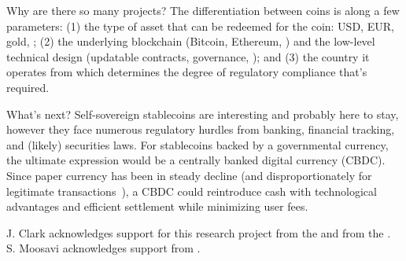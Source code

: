 Why are there so many projects? The differentiation between coins is along a few parameters: (1) the type of asset that can be redeemed for the coin: USD, EUR, gold, \etc; (2) the underlying blockchain (\eg Bitcoin, Ethereum, \etc) and the low-level technical design (updatable contracts, governance, \etc); and (3) the country it operates from which determines the degree of regulatory compliance that's required. 

What's next? Self-sovereign stablecoins are interesting and probably here to stay, however they face numerous regulatory hurdles from banking, financial tracking, and (likely) securities laws. For stablecoins backed by a governmental currency, the ultimate expression would be a centrally banked digital currency (CBDC). Since paper currency has been in steady decline (and disproportionately for legitimate transactions~\cite{rogoff2017curse}), a CBDC could reintroduce cash with technological advantages and efficient settlement while minimizing user fees.

\begin{acks}

J. Clark acknowledges support for this research project from the  and from the . S. Moosavi acknowledges support from .


\end{acks}










